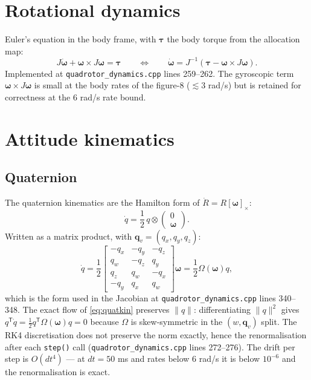 \documentclass[11pt]{article}
\newcommand{\skewm}[1]{\left[#1\right]_\times}
\newcommand{\quatmul}{\otimes}
\begin{document}
\section{Rotational dynamics}

Euler's equation in the body frame, with $\bm\tau$ the body torque from the allocation map:
\begin{equation}
  J \dot{\bm\omega} + \bm\omega \times J \bm\omega = \bm\tau
  \qquad\Longleftrightarrow\qquad
  \dot{\bm\omega} = J^{-1} \left( \bm\tau - \bm\omega \times J \bm\omega \right).
  \label{eq:rot}
\end{equation}
Implemented at \texttt{quadrotor\_dynamics.cpp} lines 259--262. The gyroscopic term
$\bm\omega \times J \bm\omega$ is small at the body rates of the figure-8 ($\lesssim 3$ rad/s)
but is retained for correctness at the 6 rad/s rate bound.

\section{Attitude kinematics}

\subsection{Quaternion}

The quaternion kinematics are the Hamilton form of $\dot R = R \skewm{\bm\omega}$:
\begin{equation}
  \dot q = \frac12 \, q \quatmul \begin{pmatrix} 0 \\ \bm\omega \end{pmatrix}.
  \label{eq:quatkin}
\end{equation}
Written as a matrix product, with $\bm q_v = (q_x, q_y, q_z)$:
\begin{equation}
  \dot q = \frac12 \begin{bmatrix}
    -q_x & -q_y & -q_z \\
    q_w & -q_z & q_y \\
    q_z & q_w & -q_x \\
    -q_y & q_x & q_w
  \end{bmatrix} \bm\omega
  = \frac12 \Omega(\bm\omega) q,
  \label{eq:quatkinmat}
\end{equation}
which is the form used in the Jacobian at \texttt{quadrotor\_dynamics.cpp} lines 340--348.
The exact flow of \eqref{eq:quatkin} preserves $\|q\|$: differentiating $\|q\|^2$ gives
$q^{\mathsf T}\dot q = \frac12 q^{\mathsf T}\Omega(\bm\omega) q = 0$ because $\Omega$ is
skew-symmetric in the $(w, \bm q_v)$ split. The RK4 discretisation does not preserve the norm
exactly, hence the renormalisation after each \texttt{step()} call
(\texttt{quadrotor\_dynamics.cpp} lines 272--276). The drift per step is $O(dt^4)$ — at
$dt = 50$ ms and rates below 6 rad/s it is below $10^{-6}$ and the renormalisation is exact.
\end{document}
